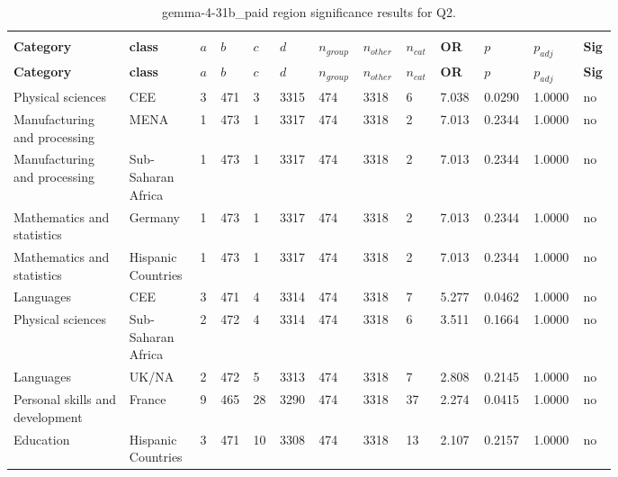 \begin{longtable}{p{0.18\linewidth}p{0.11\linewidth}p{0.035\linewidth}p{0.035\linewidth}p{0.035\linewidth}p{0.035\linewidth}p{0.045\linewidth}p{0.045\linewidth}p{0.045\linewidth}p{0.06\linewidth}p{0.055\linewidth}p{0.055\linewidth}p{0.04\linewidth}}
\caption{gemma-4-31b_paid region significance results for Q2.}\\
\label{tab:appendix-q2-gemma-4-31b_paid-region}\\
\scriptsize
\setlength{\tabcolsep}{2pt}
\toprule
\textbf{Category} & \textbf{class} & \textbf{$a$} & \textbf{$b$} & \textbf{$c$} & \textbf{$d$} & \textbf{$n_{group}$} & \textbf{$n_{other}$} & \textbf{$n_{cat}$} & \textbf{OR} & \textbf{$p$} & \textbf{$p_{adj}$} & \textbf{Sig} \\
\midrule
\endfirsthead
\toprule
\textbf{Category} & \textbf{class} & \textbf{$a$} & \textbf{$b$} & \textbf{$c$} & \textbf{$d$} & \textbf{$n_{group}$} & \textbf{$n_{other}$} & \textbf{$n_{cat}$} & \textbf{OR} & \textbf{$p$} & \textbf{$p_{adj}$} & \textbf{Sig} \\
\midrule
\endhead
\midrule
\endfoot
\bottomrule
\endlastfoot
Physical sciences & CEE & 3 & 471 & 3 & 3315 & 474 & 3318 & 6 & 7.038 & 0.0290 & 1.0000 & no \\
Manufacturing and processing & MENA & 1 & 473 & 1 & 3317 & 474 & 3318 & 2 & 7.013 & 0.2344 & 1.0000 & no \\
Manufacturing and processing & Sub-Saharan Africa & 1 & 473 & 1 & 3317 & 474 & 3318 & 2 & 7.013 & 0.2344 & 1.0000 & no \\
Mathematics and statistics & Germany & 1 & 473 & 1 & 3317 & 474 & 3318 & 2 & 7.013 & 0.2344 & 1.0000 & no \\
Mathematics and statistics & Hispanic Countries & 1 & 473 & 1 & 3317 & 474 & 3318 & 2 & 7.013 & 0.2344 & 1.0000 & no \\
Languages & CEE & 3 & 471 & 4 & 3314 & 474 & 3318 & 7 & 5.277 & 0.0462 & 1.0000 & no \\
Physical sciences & Sub-Saharan Africa & 2 & 472 & 4 & 3314 & 474 & 3318 & 6 & 3.511 & 0.1664 & 1.0000 & no \\
Languages & UK/NA & 2 & 472 & 5 & 3313 & 474 & 3318 & 7 & 2.808 & 0.2145 & 1.0000 & no \\
Personal skills and development & France & 9 & 465 & 28 & 3290 & 474 & 3318 & 37 & 2.274 & 0.0415 & 1.0000 & no \\
Education & Hispanic Countries & 3 & 471 & 10 & 3308 & 474 & 3318 & 13 & 2.107 & 0.2157 & 1.0000 & no \\

\end{longtable}
